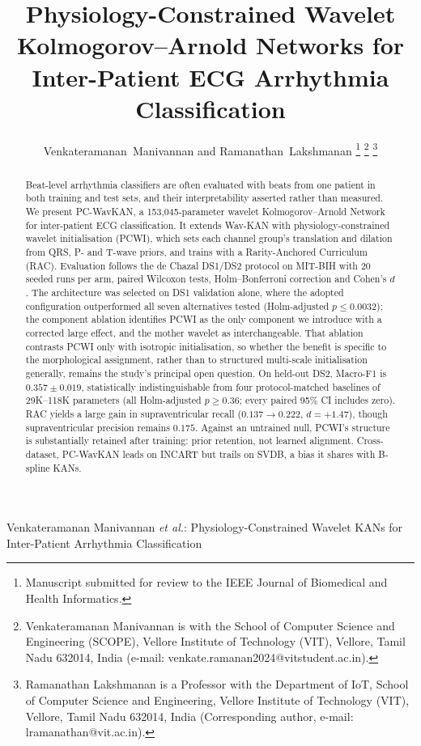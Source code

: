 \documentclass[journal,twoside,web]{ieeecolor}
\begin{document}
\title{\vspace{8mm}Physiology-Constrained Wavelet Kolmogorov--Arnold Networks for Inter-Patient ECG Arrhythmia Classification}

\author{Venkateramanan~Manivannan and Ramanathan~Lakshmanan
\thanks{Manuscript submitted for review to the IEEE Journal of Biomedical and Health Informatics.}
\thanks{Venkateramanan Manivannan is with the School of Computer Science
and Engineering (SCOPE), Vellore Institute of Technology (VIT), Vellore,
Tamil Nadu 632014, India (e-mail: venkate.ramanan2024@vitstudent.ac.in).}
\thanks{Ramanathan Lakshmanan is a Professor with the Department of IoT,
School of Computer Science and Engineering, Vellore Institute of Technology (VIT), Vellore,
Tamil Nadu 632014, India (Corresponding author, e-mail: lramanathan@vit.ac.in).}}

{Venkateramanan Manivannan \MakeLowercase{\textit{et al.}}: Physiology-Constrained Wavelet KANs for Inter-Patient Arrhythmia Classification}

\maketitle

\begin{abstract}
Beat-level arrhythmia classifiers are often evaluated with beats from one patient in both training and test sets, and their interpretability asserted rather than measured. We present PC-WavKAN, a 153,045-parameter wavelet Kolmogorov--Arnold Network for inter-patient ECG classification. It extends Wav-KAN with physiology-constrained wavelet initialisation (PCWI), which sets each channel group's translation and dilation from QRS, P- and T-wave priors, and trains with a Rarity-Anchored Curriculum (RAC). Evaluation follows the de Chazal DS1/DS2 protocol on MIT-BIH with 20 seeded runs per arm, paired Wilcoxon tests, Holm--Bonferroni correction and Cohen's $d$. The architecture was selected on DS1 validation alone, where the adopted configuration outperformed all seven alternatives tested (Holm-adjusted $p\leq0.0032$); the component ablation identifies PCWI as the only component we introduce with a corrected large effect, and the mother wavelet as interchangeable. That ablation contrasts PCWI only with isotropic initialisation, so whether the benefit is specific to the morphological assignment, rather than to structured multi-scale initialisation generally, remains the study's principal open question. On held-out DS2, Macro-F1 is $0.357\pm0.019$, statistically indistinguishable from four protocol-matched baselines of 29K--118K parameters (all Holm-adjusted $p\geq0.36$; every paired 95\% CI includes zero). RAC yields a large gain in supraventricular recall ($0.137\rightarrow0.222$, $d=+1.47$), though supraventricular precision remains $0.175$. Against an untrained null, PCWI's structure is substantially retained after training: prior retention, not learned alignment. Cross-dataset, PC-WavKAN leads on INCART but trails on SVDB, a bias it shares with B-spline KANs.
\end{abstract}
\end{document}
